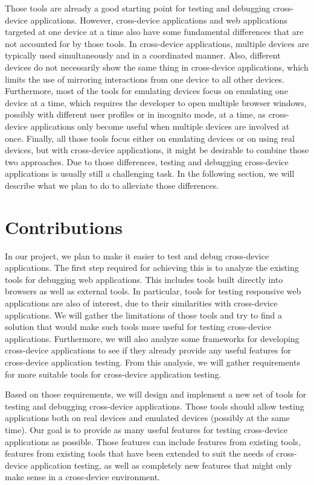 Those tools are already a good starting point for testing and debugging cross-device applications. However, cross-device applications and web applications targeted at one device at a time also have some fundamental differences that are not accounted for by those tools. In cross-device applications, multiple devices are typically used simultaneously and in a coordinated manner. Also, different devices do not necessarily show the same thing in cross-device applications, which limits the use of mirroring interactions from one device to all other devices. Furthermore, most of the tools for emulating devices focus on emulating one device at a time, which requires the developer to open multiple browser windows, possibly with different user profiles or in incognito mode, at a time, as cross-device applications only become useful when multiple devices are involved at once. Finally, all those tools focus either on emulating devices or on using real devices, but with cross-device applications, it might be desirable to combine those two approaches. Due to those differences, testing and debugging cross-device applications is usually still a challenging task. In the following section, we will describe what we plan to do to alleviate those differences. 

\section{Contributions}

In our project, we plan to make it easier to test and debug cross-device applications. The first step required for achieving this is to analyze the existing tools for debugging web applications. This includes tools built directly into browsers as well as external tools. In particular, tools for testing responsive web applications are also of interest, due to their similarities with cross-device applications. We will gather the limitations of those tools and try to find a solution that would make such tools more useful for testing cross-device applications. Furthermore, we will also analyze some frameworks for developing cross-device applications to see if they already provide any useful features for cross-device application testing. From this analysis, we will gather requirements for more suitable tools for cross-device application testing.

Based on those requirements, we will design and implement a new set of tools for testing and debugging cross-device applications. Those tools should allow testing applications both on real devices and emulated devices (possibly at the same time). Our goal is to provide as many useful features for testing cross-device applications as possible. Those features can include features from existing tools, features from existing tools that have been extended to suit the needs of cross-device application testing, as well as completely new features that might only make sense in a cross-device environment.

